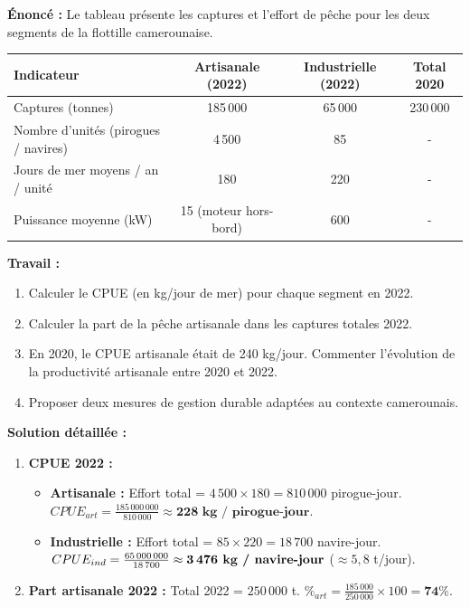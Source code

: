 \documentclass[11pt]{article}
\begin{document}
\begin{exoresolu}
\textbf{Énoncé :} Le tableau présente les captures et l'effort de pêche pour les deux segments de la flottille camerounaise.
\begin{center}
\begin{tabular}{|l|c|c|c|}\hline
\rowcolor{popblueL} \textbf{Indicateur} & \textbf{Artisanale (2022)} & \textbf{Industrielle (2022)} & \textbf{Total 2020} \\ \hline
Captures (tonnes) & 185\,000 & 65\,000 & 230\,000 \\ \hline
Nombre d'unités (pirogues / navires) & 4\,500 & 85 & - \\ \hline
Jours de mer moyens / an / unité & 180 & 220 & - \\ \hline
Puissance moyenne (kW) & 15 (moteur hors-bord) & 600 & - \\ \hline
\end{tabular}
\end{center}
\textbf{Travail :}
\begin{enumerate}
    \item Calculer le CPUE (en kg/jour de mer) pour chaque segment en 2022.
    \item Calculer la part de la pêche artisanale dans les captures totales 2022.
    \item En 2020, le CPUE artisanale était de 240 kg/jour. Commenter l'évolution de la productivité artisanale entre 2020 et 2022.
    \item Proposer deux mesures de gestion durable adaptées au contexte camerounais.
\end{enumerate}
\tcblower
\textbf{Solution détaillée :}
\begin{enumerate}
    \item \textbf{CPUE 2022 :}
    \begin{itemize}
        \item \textbf{Artisanale :} Effort total = $4\,500 \times 180 = 810\,000$ pirogue-jour.
        $CPUE_{art} = \frac{185\,000\,000}{810\,000} \approx \textbf{228 kg / pirogue-jour}$.
        \item \textbf{Industrielle :} Effort total = $85 \times 220 = 18\,700$ navire-jour.
        $CPUE_{ind} = \frac{65\,000\,000}{18\,700} \approx \textbf{3\,476 kg / navire-jour}$ ($\approx 5,8$ t/jour).
    \end{itemize}
    \item \textbf{Part artisanale 2022 :} Total 2022 = $250\,000$ t. $\%_{art} = \frac{185\,000}{250\,000} \times 100 = \textbf{74\%}$.

\end{enumerate}
\end{exoresolu}
\end{document}
